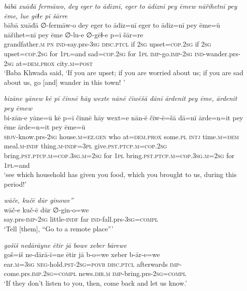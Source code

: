 \ea \label{BP.160}
\textit{bābā xuāđā fermāwo, dey eger to ādiznī, eger to ādiznī pey ēmew nāřihetnī pey ēme, lue gēɫe pī šārre} \\ 
\gll bābā xuāđā ∅-fermāw-o dey eger to ādiz=nī eger to ādiz=nī pey ēme=ū nāřihet=nī pey ēme ∅-lu-e ∅-gēɫ-e p=ī šār=re \\ 
 grandfather\textsc{.m} \textsc{pn} \textsc{ind-}say.prs\textsc{-3sg} \textsc{disc.ptcl} if \textsc{2sg} upset\textsc{=cop}\textsc{.\textsc{2sg}} if \textsc{2sg} upset\textsc{=cop}\textsc{.\textsc{2sg}} for \textsc{1pl}=and sad\textsc{=cop}\textsc{.\textsc{2sg}} for \textsc{1pl} \textsc{imp-}go.\textsc{imp-}\textsc{2sg} \textsc{ind-}wander.prs-\textsc{2sg} at=\textsc{dem.prox} city\textsc{.m}\textsc{=\textsc{post}} \\ 
\glt `Baba Khwada said, ‘If you are upset; if you are worried about us; if you are sad about us, go [and] wander in this town! '
\z 
 
\ea \label{BP.161}
\textit{bizāne yānew kē pī činnē hāy wexte nānē čīwēšā dānī ārdenit pey ēme, ārdenit pey ēmew} \\ 
\gll bi-zān-e yāne=ū kē p=ī činnē hāy wext=e nān-ē čīw-ē=šā dā=nī ārde=n=it pey ēme ārde=n=it pey ēme=ū \\ 
 \textsc{sbjv-}know.prs-\textsc{2sg} house\textsc{.m}\textsc{=ez.gen} who at=\textsc{dem.prox} some\textsc{.pl} \textsc{intj} time\textsc{.m}\textsc{=dem} meal\textsc{.m}\textsc{-indf} thing\textsc{.m}\textsc{-indf}\textsc{=3pl} give\textsc{.pst}\textsc{.ptcp}\textsc{.m}\textsc{=cop}\textsc{.\textsc{2sg}} bring\textsc{.pst}\textsc{.ptcp}\textsc{.m}\textsc{=cop}\textsc{.3sg}\textsc{.m}\textsc{=\textsc{2sg}} for \textsc{1pl} bring\textsc{.pst}\textsc{.ptcp}\textsc{.m}\textsc{=cop}\textsc{.3sg}\textsc{.m}\textsc{=\textsc{2sg}} for \textsc{1pl}=and \\ 
\glt `see which household has given you food, which you brought to us, during this period!'
\z 
 
\ea \label{BP.162}
\textit{wāče, kučē dūr ginowe”} \\ 
\gll wāč-e kuč-ē dūr ∅-gin-o=we \\ 
 say.prs-\textsc{imp-}\textsc{2sg} little\textsc{-indf} far \textsc{ind-}fall.prs\textsc{-3sg}\textsc{=compl} \\ 
\glt `Tell [them], “Go to a remote place”'
\z 
 
\ea \label{BP.164}
\textit{gošiš nedārāyne ētir jā bowe xeber bārewe} \\ 
\gll goš=iš ne-dārā-ī=ne ētir jā b-o=we xeber b-ār-e=we \\ 
 ear\textsc{.m}\textsc{=3sg} \textsc{neg-}hold\textsc{.pst}-\textsc{2sg}\textsc{=\textsc{povb}} \textsc{disc.ptcl} afterwards \textsc{imp-}come.prs\textsc{.imp}\textsc{.\textsc{2sg}}\textsc{=compl} news\textsc{.dir}\textsc{.m} \textsc{imp-}bring.prs-\textsc{2sg}\textsc{=compl} \\ 
\glt `If they don’t listen to you, then, come back and let us know.'
\z 
 
